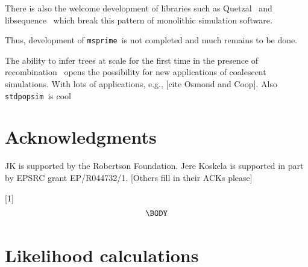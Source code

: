 \documentclass{article}
\newcommand{\msprime}[0]{\texttt{msprime}}
\newcommand{\stdpopsim}[0]{\texttt{stdpopsim}}
\begin{document}
There is also the welcome development of libraries such as
Quetzal~\citep{becheler2019quetzal} and libsequence~\citep{thornton2014cpp}
which break this pattern of monolithic simulation software.


Thus, development of \msprime\ is not completed and much remains
to be done.


The ability to infer trees at scale for the first time
in the presence of
recombination~\citep{harris2019database,kelleher2019inferring,
speidel2019method,tang2019genealogy}
opens the possibility for new applications of coalescent simulations.
With lots of applications, e.g., [cite Osmond and Coop].
Also \stdpopsim\ is cool~\citep{adrion2020community}

\section*{Acknowledgments}
JK is supported by the Robertson Foundation.
Jere Koskela is supported in part by EPSRC grant EP/R044732/1.
[Others fill in their ACKs please]





 \newcommand{\be}{\begin{equation}}
 \newcommand{\ee}{\end{equation}}
 \newcommand{\bd}{\begin{displaymath}}
 \newcommand{\ed}{\end{displaymath}}
\newcommand{\IN}{\ensuremath{\mathds{N}}}%
\newcommand{\EE}[1]{\ensuremath{\mathds{E}\left[ #1 \right]}}%
\newcommand{\one}[1]{\ensuremath{\mathds{1}_{\left\{ #1 \right\}}}}%
\newcommand{\prb}[1]{\ensuremath{\mathds{P}\left( #1 \right) } }%

[1]{%
\begin{equation}
\label{#1}
\begin{split}
  \BODY
\end{split}\end{equation}
}

\setcounter{secnumdepth}{2} %

\appendix

\label{app-likelihoods}
\section*{Likelihood calculations}
\end{document}
